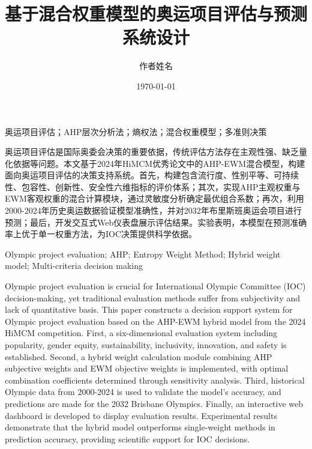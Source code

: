 \documentclass[twoside]{CUGThesis}
\title{基于混合权重模型的奥运项目评估与预测系统设计}
\author{作者姓名}
\date{\today}
\begin{document}
\maketitle
\makestatement

\begin{cnabstract}{奥运项目评估；AHP层次分析法；熵权法；混合权重模型；多准则决策}

奥运项目评估是国际奥委会决策的重要依据，传统评估方法存在主观性强、缺乏量化依据等问题。本文基于2024年HiMCM优秀论文中的AHP-EWM混合模型，构建面向奥运项目评估的决策支持系统。首先，构建包含流行度、性别平等、可持续性、包容性、创新性、安全性六维指标的评价体系；其次，实现AHP主观权重与EWM客观权重的混合计算模块，通过灵敏度分析确定最优组合系数；再次，利用2000-2024年历史奥运数据验证模型准确性，并对2032年布里斯班奥运会项目进行预测；最后，开发交互式Web仪表盘展示评估结果。实验表明，本模型在预测准确率上优于单一权重方法，为IOC决策提供科学依据。

\end{cnabstract}

\begin{enabstract}{Olympic project evaluation; AHP; Entropy Weight Method; Hybrid weight model; Multi-criteria decision making}

Olympic project evaluation is crucial for International Olympic Committee (IOC) decision-making, yet traditional evaluation methods suffer from subjectivity and lack of quantitative basis. This paper constructs a decision support system for Olympic project evaluation based on the AHP-EWM hybrid model from the 2024 HiMCM competition. First, a six-dimensional evaluation system including popularity, gender equity, sustainability, inclusivity, innovation, and safety is established. Second, a hybrid weight calculation module combining AHP subjective weights and EWM objective weights is implemented, with optimal combination coefficients determined through sensitivity analysis. Third, historical Olympic data from 2000-2024 is used to validate the model's accuracy, and predictions are made for the 2032 Brisbane Olympics. Finally, an interactive web dashboard is developed to display evaluation results. Experimental results demonstrate that the hybrid model outperforms single-weight methods in prediction accuracy, providing scientific support for IOC decisions.

\end{enabstract}

\makeToc
\end{document}
